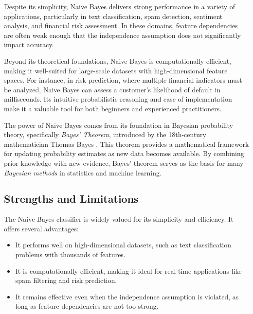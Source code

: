 \documentclass[
]{book}
\providecommand{\tightlist}{%
  \setlength{\itemsep}{0pt}\setlength{\parskip}{0pt}}
\theoremstyle{definition}
\theoremstyle{definition}
\theoremstyle{definition}
\theoremstyle{definition}
\theoremstyle{remark}
\begin{document}
Despite its simplicity, Naive Bayes delivers strong performance in a variety of applications, particularly in text classification, spam detection, sentiment analysis, and financial risk assessment. In these domains, feature dependencies are often weak enough that the independence assumption does not significantly impact accuracy.

Beyond its theoretical foundations, Naive Bayes is computationally efficient, making it well-suited for large-scale datasets with high-dimensional feature spaces. For instance, in risk prediction, where multiple financial indicators must be analyzed, Naive Bayes can assess a customer's likelihood of default in milliseconds. Its intuitive probabilistic reasoning and ease of implementation make it a valuable tool for both beginners and experienced practitioners.

The power of Naive Bayes comes from its foundation in Bayesian probability theory, specifically \emph{Bayes' Theorem}, introduced by the 18th-century mathematician Thomas Bayes \citep{bayes1958essay}. This theorem provides a mathematical framework for updating probability estimates as new data becomes available. By combining prior knowledge with new evidence, Bayes' theorem serves as the basis for many \emph{Bayesian methods} in statistics and machine learning.

\subsection*{Strengths and Limitations}\label{strengths-and-limitations}

The Naive Bayes classifier is widely valued for its simplicity and efficiency. It offers several advantages:

\begin{itemize}
\tightlist
\item
  It performs well on high-dimensional datasets, such as text classification problems with thousands of features.\\
\item
  It is computationally efficient, making it ideal for real-time applications like spam filtering and risk prediction.\\
\item
  It remains effective even when the independence assumption is violated, as long as feature dependencies are not too strong.
\end{itemize}
\end{document}
